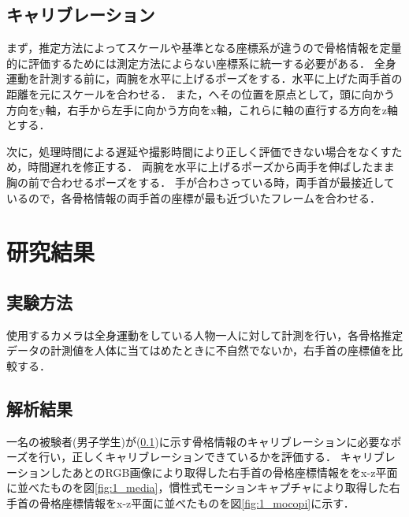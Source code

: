 \documentclass[titlepage]{jarticle}
\begin{document}
\subsection{キャリブレーション}\label{kyari}
まず，推定方法によってスケールや基準となる座標系が違うので骨格情報を定量的に評価するためには測定方法によらない座標系に統一する必要がある．
全身運動を計測する前に，両腕を水平に上げるポーズをする．水平に上げた両手首の距離を元にスケールを合わせる．
また，へその位置を原点として，頭に向かう方向をy軸，右手から左手に向かう方向をx軸，これらに軸の直行する方向をz軸とする．

次に，処理時間による遅延や撮影時間により正しく評価できない場合をなくすため，時間遅れを修正する．
両腕を水平に上げるポーズから両手を伸ばしたまま胸の前で合わせるポーズをする．
手が合わさっている時，両手首が最接近しているので，各骨格情報の両手首の座標が最も近づいたフレームを合わせる．


\section{研究結果}
\subsection{実験方法}
使用するカメラは全身運動をしている人物一人に対して計測を行い，各骨格推定データの計測値を人体に当てはめたときに不自然でないか，右手首の座標値を比較する．
\subsection{解析結果}
一名の被験者(男子学生)が(\ref{kyari})に示す骨格情報のキャリブレーションに必要なポーズを行い，正しくキャリブレーションできているかを評価する．
キャリブレーションしたあとのRGB画像により取得した右手首の骨格座標情報ををx-z平面に並べたものを図\ref{fig:1_media}，慣性式モーションキャプチャにより取得した右手首の骨格座標情報をx-z平面に並べたものを図\ref{fig:1_mocopi}に示す．
\end{document}
